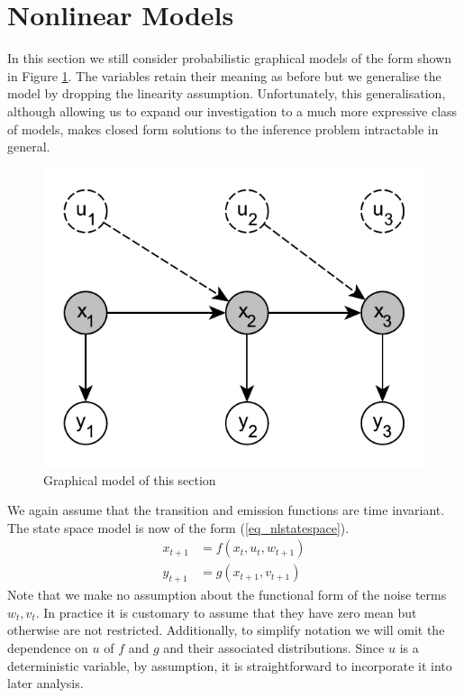 \documentclass[../masters.tex]{subfiles}
\begin{document}
\graphicspath{{./imgs/}{../imgs/}} %

\section{Nonlinear Models}
In this section we still consider probabilistic graphical models of the form shown in Figure \ref{fig_nlmod}. The variables retain their meaning as before but we generalise the model by dropping the linearity assumption. Unfortunately, this generalisation, although allowing us to expand our investigation to a much more expressive class of models, makes closed form solutions to the inference problem intractable in general.   
\begin{figure}[H] 
\centering
\includegraphics[scale=1.0]{linear_model.pdf}
\caption{Graphical model of this section}
\label{fig_nlmod}
\end{figure}
We again assume that the transition and emission functions are time invariant. The state space model is now of the form (\ref{eq_nlstatespace}).
\begin{equation}
\begin{aligned}
x_{t+1} &= f(x_t, u_t, w_{t+1}) \\
y_{t+1} &= g(x_{t+1}, v_{t+1})
\end{aligned}
\label{eq_nlstatespace}
\end{equation}
Note that we make no assumption about the functional form of the noise terms $w_t,v_t$. In practice it is customary to assume that they have zero mean but otherwise are not restricted. Additionally, to simplify notation we will omit the dependence on $u$ of $f$ and $g$ and their associated distributions. Since $u$ is a deterministic variable, by assumption, it is straightforward to incorporate it into later analysis. 
\end{document}
